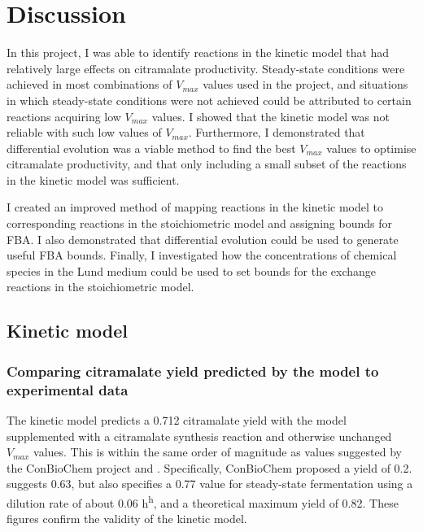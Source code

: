\documentclass[parskip=full, numbers=noenddot]{scrreprt}
\begin{document}

\chapter{Discussion}
\label{ch:discussion}


In this project, I was able to identify reactions in the kinetic model that had relatively large effects on citramalate productivity. Steady-state conditions were achieved in most combinations of $V_{max}$ values used in the project, and situations in which steady-state conditions were not achieved could be attributed to certain reactions acquiring low $V_{max}$ values. I showed that the kinetic model was not reliable with such low values of $V_{max}$. Furthermore, I demonstrated that differential evolution was a viable method to find the best $V_{max}$ values to optimise citramalate productivity, and that only including a small subset of the reactions in the kinetic model was sufficient.

I created an improved method of mapping reactions in the kinetic model to corresponding reactions in the stoichiometric model and assigning bounds for FBA. I also demonstrated that differential evolution could be used to generate useful FBA bounds. Finally, I investigated how the concentrations of chemical species in the Lund medium could be used to set bounds for the exchange reactions in the stoichiometric model.

\section{Kinetic model}
\label{sec:discussion-kinetic}


\subsection{Comparing citramalate yield predicted by the model to experimental data}
\label{ssec:discussion-kinetic-experimental}

The kinetic model predicts a 0.712 citramalate yield with the model supplemented with a citramalate synthesis reaction and otherwise unchanged $V_{max}$ values. This is within the same order of magnitude as values suggested by the ConBioChem project and \citet{wu_production_2016}. Specifically, ConBioChem proposed a yield of 0.2. \citet{wu_production_2016} suggests 0.63, but also specifies a 0.77 value for steady-state fermentation using a dilution rate of about 0.06 h\textsuperscript{h}, and a theoretical maximum yield of 0.82. These figures confirm the validity of the kinetic model.
\end{document}
